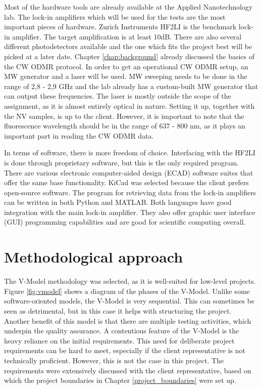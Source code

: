 \documentclass{report}
\begin{document}
	Most of the hardware tools are already available at the Applied Nanotechnology lab. The lock-in amplifiers which will be used for the tests are the most important pieces of hardware. Zurich Instruments HF2LI is the benchmark lock-in amplifier. The target amplification is at least 10dB. There are also several different photodetectors available and the one which fits the project best will be picked at a later date. Chapter \ref{chap:background} already discussed the basics of the CW ODMR protocol. In order to get an operational CW ODMR setup, an MW generator and a laser will be used. MW sweeping needs to be done in the range of 2,8 - 2,9 GHz and the lab already has a custom-built MW generator that can output these frequencies. The laser is mostly outside the scope of the assignment, as it is almost entirely optical in nature. Setting it up, together with the NV samples, is up to the client. However, it is important to note that the fluorescence wavelength should be in the range of 637 - 800 nm, as it plays an important part in reading the CW ODMR data.
	
	In terms of software, there is more freedom of choice. Interfacing with the HF2LI is done through proprietary software, but this is the only required program. There are various electronic computer-aided design (ECAD) software suites that offer the same base functionality. KiCad was selected because the client prefers open-source software. The program for retrieving data from the lock-in amplifiers can be written in both Python and MATLAB. Both languages have good integration with the main lock-in amplifier. They also offer graphic user interface (GUI) programming capabilities and are good for scientific computing overall.
	
	\section{Methodological approach}\label{methodological_approach}
	The V-Model methodology was selected, as it is well-suited for low-level projects. Figure \ref{fig:vmodel} shows a diagram of the phases of the V-Model. Unlike some software-oriented models, the V-Model is very sequential. This can sometimes be seen as detrimental, but in this case it helps with structuring the project. Another benefit of this model is that there are multiple testing activities, which underpin the quality assurance. A contentious feature of the V-Model is the heavy reliance on the initial requirements. This need for deliberate project requirements can be hard to meet, especially if the client representative is not technically proficient. However, this is not the case in this project. The requirements were extensively discussed with the client representative, based on which the project boundaries in Chapter \ref{project_boundaries} were set up.
	
\end{document}
